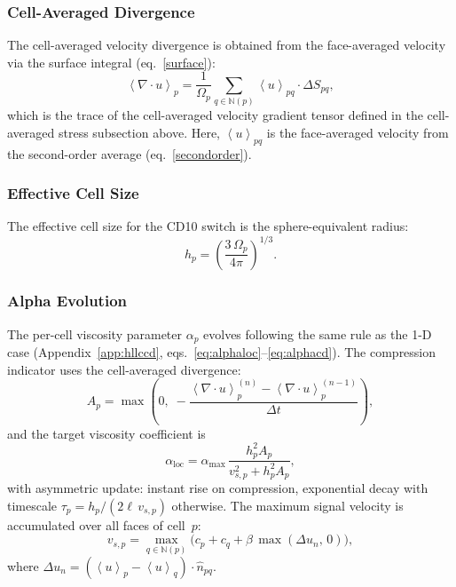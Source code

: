 \documentclass[twocolumn]{aastex63}
\newcommand{\vel}{{u}}
\newcommand{\surf}[0]{S}
\begin{document}
\subsubsection{Cell-Averaged Divergence}

The cell-averaged velocity divergence is obtained from
the face-averaged velocity via the surface integral
(eq.~\ref{surface}):
\begin{equation}\label{eq:divv3d}
  \left<\nabla\cdot\vel\right>_p
  = \frac{1}{\Omega_p}
    \sum_{q\in\mathbb{N}(p)}
      \left<\vel\right>_{pq} \cdot \Delta\surf_{pq},
\end{equation}
which is the trace of the cell-averaged velocity gradient
tensor defined in the cell-averaged stress subsection above.
Here, $\left<\vel\right>_{pq}$ is the face-averaged velocity
from the second-order average
(eq.~\ref{secondorder}).

\subsubsection{Effective Cell Size}

The effective cell size for the CD10 switch is
the sphere-equivalent radius:
\begin{equation}
  h_p = \left(\frac{3\,\Omega_p}{4\pi}\right)^{1/3}.
\end{equation}

\subsubsection{Alpha Evolution}

The per-cell viscosity parameter $\alpha_p$ evolves
following the same rule as the 1-D case
(Appendix~\ref{app:hllccd},
eqs.~\ref{eq:alphaloc}--\ref{eq:alphacd}).
The compression indicator uses the cell-averaged divergence:
\begin{equation}
  A_p = \max\!\left(0,\;
    -\frac{\left<\nabla\!\cdot\!\vel\right>_p^{(n)}
         - \left<\nabla\!\cdot\!\vel\right>_p^{(n-1)}}
          {\Delta t}\right),
\end{equation}
and the target viscosity coefficient is
\begin{equation}
  \alpha_\mathrm{loc}
  = \alpha_\mathrm{max}\,
    \frac{h_p^2 A_p}{v_{s,p}^2 + h_p^2 A_p},
\end{equation}
with asymmetric update:
instant rise on compression,
exponential decay with timescale
$\tau_p = h_p / (2\ell\,v_{s,p})$ otherwise.
The maximum signal velocity is accumulated over all
faces of cell~$p$:
\begin{equation}
  v_{s,p} = \max_{q\in\mathbb{N}(p)}
    \bigl(c_p + c_q + \beta\,\max(\Delta\vel_n,\,0)\bigr),
\end{equation}
where $\Delta\vel_n = (\left<\vel\right>_p - \left<\vel\right>_q)
  \cdot\hat{n}_{pq}$.
\end{document}
